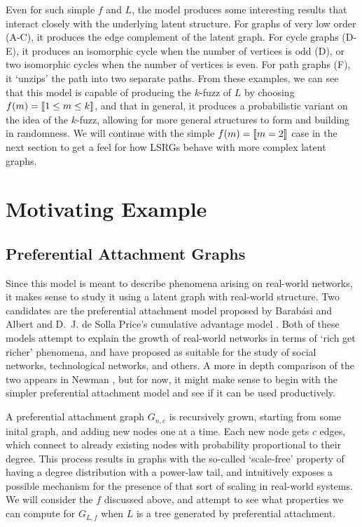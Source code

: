 \documentclass[12pt]{article}
\DeclarePairedDelimiter\iverson{\llbracket}{\rrbracket}%
\begin{document}
Even for such simple $f$ and $L$, the model produces some interesting
results that interact closely with the underlying latent structure.
For graphs of very low order (A-C), it produces the edge complement of the
latent graph. For cycle graphs (D-E), it produces an isomorphic cycle
when the number of vertices is odd (D), or two isomorphic cycles when
the number of vertices is even. For path graphs (F), it `unzips' the
path into two separate paths. From these examples, we can see that this
model is capable of producing the $k$-fuzz \cite{doylesnell} of $L$
by choosing $f(m)=\iverson{1 \leq m \leq k}$, and that in general, it
produces a probabilistic variant on the idea of the $k$-fuzz, allowing
for more general structures to form and building in randomness.
We will continue with the simple $f(m)=\iverson{m=2}$ case in the next
section to get a feel for how LSRGs behave with more complex latent
graphs.


\section{\textbf{\textsf{Motivating Example}}}

\subsection{\textbf{\textsf{Preferential Attachment Graphs}}}

Since this model is meant to describe phenomena arising on real-world
networks, it makes sense to study it using a latent graph with real-world
structure. Two candidates are the preferential attachment model proposed by
Barab{\'a}si and Albert \cite{prefatt} and D.~J. de Solla Price's cumulative
advantage model \cite{cumadv}. Both of these models attempt to explain the
growth of real-world networks in terms of `rich get richer' phenomena,
and have proposed as suitable for the study of social networks, technological
networks, and others. A more in depth comparison of the two appears in
Newman \cite{Newman2003}, but for now, it might make sense to begin with
the simpler preferential attachment model and see if it can be used
productively.\par

A preferential attachment graph $G_{n,c}$ is recursively grown, starting
from some inital graph, and adding new nodes one at a time. Each new node
gets $c$ edges, which connect to already existing nodes with probability
proportional to their degree. This process results in graphs with the
so-called `scale-free' property of having a degree distribution with
a power-law tail, and intuitively exposes a possible mechanism for the
presence of that sort of scaling in real-world systems. We will consider
the $f$ discussed above, and attempt to see what properties we can compute
for $G_{L,f}$ when $L$ is a tree generated by preferential attachment.
\end{document}
